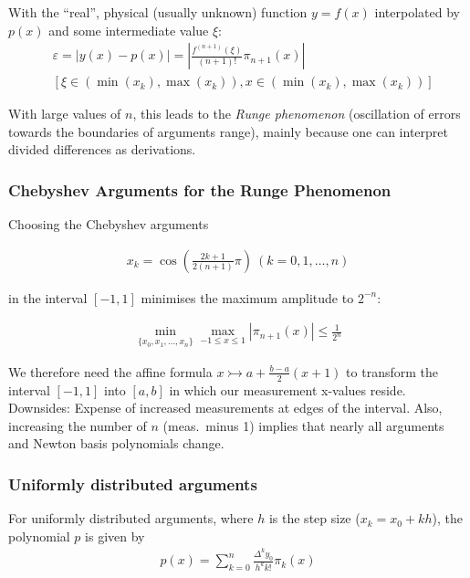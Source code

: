 With the ``real'', physical (usually unknown) function $y=f(x)$ interpolated by $p(x)$ and some intermediate value $\xi$:
\begin{align*}
    & \varepsilon = |y(x)-p(x)| = \left|\frac{f^{(n+1)}(\xi)}{(n+1)!}\pi_{n+1}(x)\right| \\
    & \left[\xi\in \left(\min(x_k),\max(x_k)\right) ,x\in (\min(x_k),\max(x_k))\right]
\end{align*}

With large values of $n$, this leads to the \emph{Runge phenomenon} (oscillation of errors towards the boundaries of arguments range),
mainly because one can interpret divided differences as derivations.

\subsubsection{Chebyshev Arguments for the Runge Phenomenon}

Choosing the Chebyshev arguments

\begin{align*}
    x_k = \cos\left( \frac{2k+1}{2(n+1)}\pi \right)\ (k=0,1,\ldots,n)
\end{align*}

in the interval $[-1,1]$ minimises the maximum amplitude to $2^{-n}$:

\begin{align*}
    \min_{\{x_0,x_1,\ldots,x_n\}}\max_{-1\leq x \leq 1} \left|\pi_{n+1}(x)\right| \leq \frac{1}{2^n}
\end{align*}

We therefore need the affine formula $x\rightarrowtail a+\frac{b-a}{2}(x+1)$
to transform the interval $[-1,1]$ into $[a,b]$ in which our measurement x-values reside.
Downsides: Expense of increased measurements at edges of the interval.
Also, increasing the number of $n$ (meas.\ minus 1) implies that nearly all arguments and Newton basis polynomials change.

\subsubsection{Uniformly distributed arguments}

For uniformly distributed arguments, where $h$ is the step size ($x_k = x_0 + kh$),
the polynomial $p$ is given by
\begin{align*}
    p(x) = \sum_{k=0}^n \frac{\Delta^k y_0}{h^kk!}\pi_k(x)
\end{align*}

